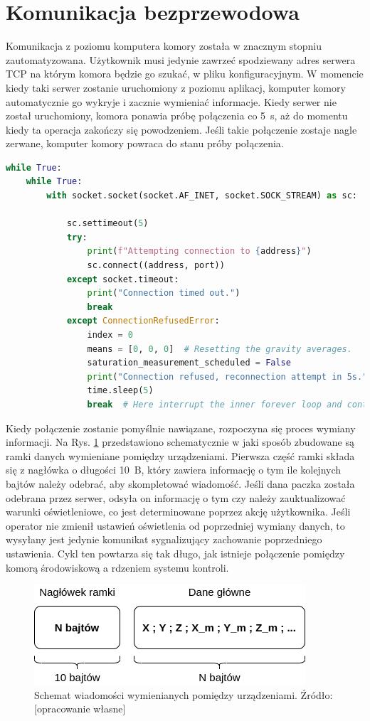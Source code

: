 \section{Komunikacja bezprzewodowa}

Komunikacja z poziomu komputera komory została w znacznym stopniu zautomatyzowana. Użytkownik musi jedynie zawrzeć spodziewany adres serwera TCP na którym komora będzie go szukać, w pliku konfiguracyjnym. W momencie kiedy taki serwer zostanie uruchomiony z poziomu aplikacj, komputer komory automatycznie go wykryje i zacznie wymieniać informacje. Kiedy serwer nie został uruchomiony, komora ponawia próbę połączenia co \SI{5}{s}, aż do momentu kiedy ta operacja zakończy się powodzeniem. Jeśli takie połączenie zostaje nagle zerwane, komputer komory powraca do stanu próby połączenia.
\begin{lstlisting}[language=Python,caption={Obsługa połączenia z serwerem TCP.}]
while True:
	while True:
		with socket.socket(socket.AF_INET, socket.SOCK_STREAM) as sc:
		
			sc.settimeout(5)
			try:
				print(f"Attempting connection to {address}")
				sc.connect((address, port))
			except socket.timeout:
				print("Connection timed out.")
				break
			except ConnectionRefusedError:
				index = 0
				means = [0, 0, 0]  # Resetting the gravity averages.
				saturation_measurement_scheduled = False
				print("Connection refused, reconnection attempt in 5s.")
				time.sleep(5)
				break  # Here interrupt the inner forever loop and continue to watch for the connection.
\end{lstlisting}

Kiedy połączenie zostanie pomyślnie nawiązane, rozpoczyna się proces wymiany informacji. Na Rys. \ref{fig:ramka danych} przedstawiono schematycznie w jaki sposób zbudowane są ramki danych wymieniane pomiędzy urządzeniami. Pierwsza część ramki składa się z nagłówka o długości \SI{10}{B}, który zawiera informację o tym ile kolejnych bajtów należy odebrać, aby skompletować wiadomość. Jeśli dana paczka została odebrana przez serwer, odsyła on informację o tym czy należy zauktualizować warunki oświetleniowe, co jest determinowane poprzez akcję użytkownika. Jeśli operator nie zmienił ustawień oświetlenia od poprzedniej wymiany danych, to wysyłany jest jedynie komunikat sygnalizujący zachowanie poprzedniego ustawienia. Cykl ten powtarza się tak długo, jak istnieje połączenie pomiędzy komorą środowiskową a rdzeniem systemu kontroli.


\begin{figure}[h]
	\centering
	\includegraphics[scale=.5]{ramka}
	\caption{Schemat wiadomości wymienianych pomiędzy urządzeniami. Źródło: [opracowanie własne]} 
	\label{fig:ramka danych}
\end{figure}


